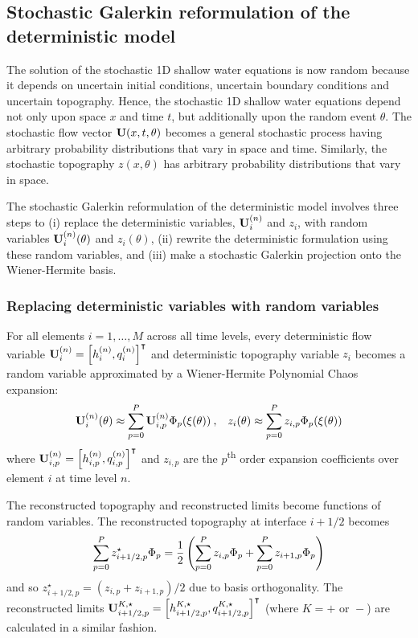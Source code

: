 \subsection{Stochastic Galerkin reformulation of the deterministic model}
The solution of the stochastic 1D shallow water equations is now random because it depends on uncertain initial conditions, uncertain boundary conditions and uncertain topography.
Hence, the stochastic 1D shallow water equations depend not only upon space $x$ and time $t$, but additionally upon the random event $\theta$.
The stochastic flow vector $\mathbf{U}(x, t, \theta)$ becomes a general stochastic process having arbitrary probability distributions that vary in space and time.
Similarly, the stochastic topography $z(x, \theta)$ has arbitrary probability distributions that vary in space.

The stochastic Galerkin reformulation of the deterministic model involves three steps to (i) replace the deterministic variables, $\mathbf{U}_i^{(n)}$ and $z_i$, with random variables $\mathbf{U}_i^{(n)}(\theta)$ and $z_i(\theta)$, (ii) rewrite the deterministic formulation using these random variables, and (iii) make a stochastic Galerkin projection onto the Wiener-Hermite basis.

\subsubsection*{Replacing deterministic variables with random variables}

For all elements $i=1, \ldots, M$ across all time levels, every deterministic flow variable $\mathbf{U}_i^{(n)} = \left[h_i^{(n)}, q_i^{(n)}\right]^\intercal$ and deterministic topography variable $z_i$ becomes a random variable approximated by a Wiener-Hermite Polynomial Chaos expansion:
\begin{align}
\flow_i^{(n)}(\theta) \approx \sum _{p=0}^P \flow_{i,p}^{(n)} \pcbasis_p(\xi(\theta))
    \:\text{,}\quad
z_i(\theta) \approx \sum_{p=0}^P z_{i,p} \pcbasis_p(\xi(\theta))
\label{eqn:pc-expansion}%
\end{align}
where $\mathbf{U}_{i,p}^{(n)} = \left[ h_{i,p}^{(n)}, q_{i,p}^{(n)} \right]^\intercal$ and $z_{i,p}$ are the $p$\textsuperscript{th} order expansion coefficients over element $i$ at time level $n$.

The reconstructed topography and reconstructed limits become functions of random variables.
The reconstructed topography at interface $i+1/2$ becomes
\begin{align}
	\sum_{p=0}^P z^\star_{i+1/2,p} \Phi_p
	=
	\frac{1}{2}
	\left(
	\sum_{p=0}^P z_{i,p} \Phi_p
	+
	\sum_{p=0}^P z_{i+1,p} \Phi_p
	\right)
\end{align}
and so $z^\star_{i+1/2,p} = (z_{i,p} + z_{i+1,p})/2$ due to basis orthogonality.
The reconstructed limits $\mathbf{U}^{K,\star}_{i+1/2,p} = \left[ h^{K,\star}_{i+1/2,p}, q^{K,\star}_{i+1/2,p} \right]^\intercal$ (where $K = + \text{ or } -$) are calculated in a similar fashion.

